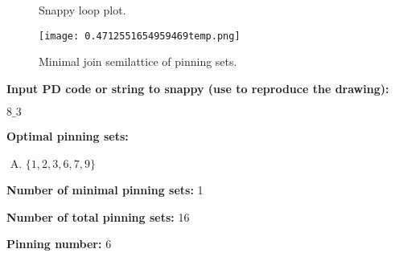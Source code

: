 \documentclass{article}%
\begin{document}
\begin{multicols}{2}
\begin{figure}[H]
\centering

\caption{Snappy loop plot.}
\label{fig:0.014841432303396407temp.svg}
\end{figure}\columnbreak

\begin{figure}[H]
\centering
\texttt{[image: 0.4712551654959469temp.png]}
\caption{Minimal join semilattice of pinning sets.}
\label{fig:0.4712551654959469temp.png}
\end{figure}\end{multicols}\newpage\begin{multicols}{2}

\columnbreak

\noindent\textbf{Input PD code or string to snappy (use to reproduce the drawing):}

	$8\_3$

\noindent\textbf{Optimal pinning sets:}

\begin{enumerate}[A)]
\item{\Huge\textcolor{red0}{\textbullet}}$\{1,2,3,6,7,9\}$

\end{enumerate}


\noindent\textbf{Number of minimal pinning sets:} 1

\noindent\textbf{Number of total pinning sets:} 16

\noindent\textbf{Pinning number:} 6


\end{multicols}
\end{document}

